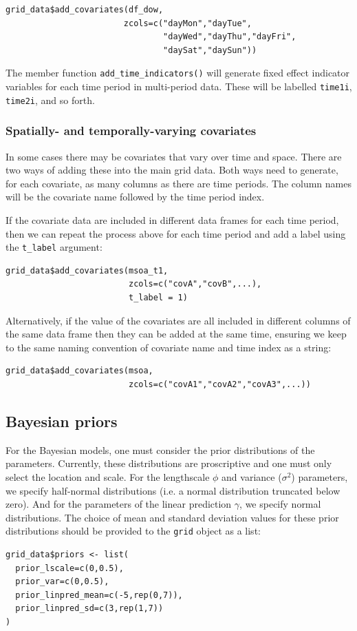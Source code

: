 \begin{lstlisting}
grid_data$add_covariates(df_dow,
                        zcols=c("dayMon","dayTue",
                                "dayWed","dayThu","dayFri",
                                "daySat","daySun"))
\end{lstlisting}

The member function \texttt{add\_time\_indicators()} will generate fixed effect indicator variables for each time period in multi-period data. These will be labelled \texttt{time1i}, \texttt{time2i}, and so forth.

\subsubsection{Spatially- and temporally-varying covariates}
In some cases there may be covariates that vary over time and space. There are two ways of adding these into the main grid data. Both ways need to generate, for each covariate, as many columns as there are time periods. The column names will be the covariate name followed by the time period index.

If the covariate data are included in different data frames for each time period, then we can repeat the process above for each time period and add a label using the \texttt{t\_label} argument:

\begin{lstlisting}
grid_data$add_covariates(msoa_t1,
                         zcols=c("covA","covB",...),
                         t_label = 1)
\end{lstlisting}

Alternatively, if the value of the covariates are all included in different columns of the same data frame then they can be added at the same time, ensuring we keep to the same naming convention of covariate name and time index as a string:

\begin{lstlisting}
grid_data$add_covariates(msoa,
                         zcols=c("covA1","covA2","covA3",...))
\end{lstlisting}

\subsection{Bayesian priors}
For the Bayesian models, one must consider the prior distributions of the parameters. Currently, these distributions are proscriptive and one must only select the location and scale. For the lengthscale $\phi$ and variance ($\sigma^2$) parameters, we specify half-normal distributions (i.e. a normal distribution truncated below zero). And for the parameters of the linear prediction $\gamma$, we specify normal distributions. The choice of mean and standard deviation values for these prior distributions should be provided to the \texttt{grid} object as a list:
\begin{lstlisting}
grid_data$priors <- list(
  prior_lscale=c(0,0.5),
  prior_var=c(0,0.5),
  prior_linpred_mean=c(-5,rep(0,7)),
  prior_linpred_sd=c(3,rep(1,7))
)
\end{lstlisting}

